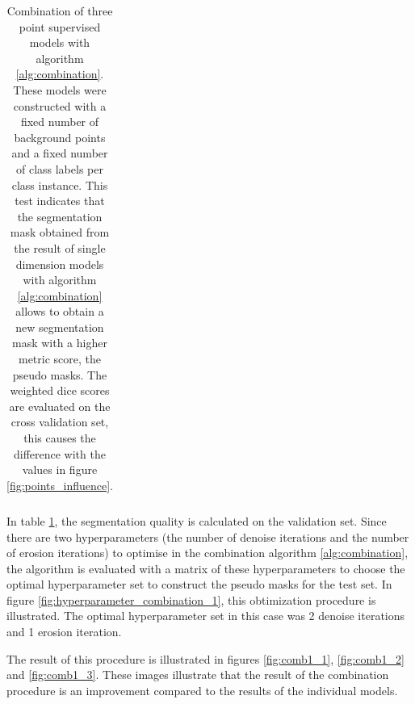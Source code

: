 \begin{table}
\begin{tabular}{l|lll}
        \end{tabular}
    \caption{Combination of three point supervised models with algorithm \ref{alg:combination}. 
    These models were constructed with a fixed number of background points and a fixed number of class labels per class instance.
    This test indicates that the segmentation mask obtained from the result of single dimension models with algorithm \ref{alg:combination} allows to obtain a new segmentation mask with a higher metric score, the pseudo masks.
    The weighted dice scores are evaluated on the cross validation set, this causes the difference with the values in figure \ref{fig:points_influence}. \label{tab:combination_1}
    }

\end{table}
\par{
    In table \ref{tab:combination_1}, the segmentation quality is calculated on the validation set.
    Since there are two hyperparameters (the number of denoise iterations and the number of erosion iterations) to optimise in the combination algorithm \ref{alg:combination}, 
    the algorithm is evaluated with a matrix of these hyperparameters to choose the optimal hyperparameter set to construct the pseudo masks for the test set.
    In figure \ref{fig:hyperparameter_combination_1}, this obtimization procedure is illustrated.
    The optimal hyperparameter set in this case was 2 denoise iterations and 1 erosion iteration.
}
\par{
    The result of this procedure is illustrated in figures \ref{fig:comb1_1}, \ref{fig:comb1_2} and \ref{fig:comb1_3}.
    These images illustrate that the result of the combination procedure is an improvement compared to the results of the individual models.
}   
